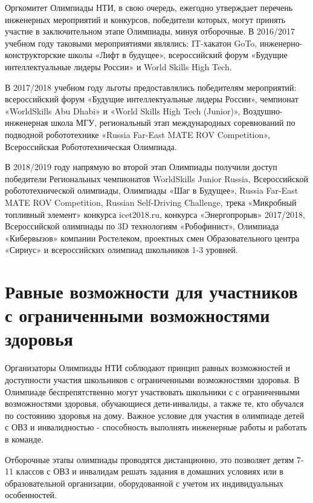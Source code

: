 Оргкомитет Олимпиады НТИ, в свою очередь, ежегодно утверждает перечень инженерных мероприятий и конкурсов, победители которых, могут принять участие в заключительном этапе Олимпиады, минуя отборочные. В 2016/2017 учебном году таковыми мероприятиями являлись: IT-хакатон GoTo, инженерно-конструкторские школы «Лифт в будущее»,  всероссийский форум «Будущие интеллектуальные лидеры России» и World Skills High Tech. 

В 2017/2018 учебном году льготы предоставлялись победителям мероприятий: всероссийский форум «Будущие интеллектуальные лидеры России», чемпионат \linebreak «WorldSkills Abu Dhabi» и «World Skills High Tech (Junior)», Воздушно-инженерная школа МГУ, региональный этап международных соревнований по подводной робототехнике «Russia Far-East MATE ROV Competition», Всероссийская Робототехническая Олимпиада.

В 2018/2019 году напрямую во второй этап Олимпиады получили доступ победители Региональных чемпионатов WorldSkills Junior Russia, Всероссийской робототехнической олимпиады, Олимпиады «Шаг в Будущее», Russia Far-East MATE ROV Competition, Russian Self-Driving Challenge, трека «Микробный топливный элемент» конкурса icet2018.ru, конкурса «Энергопрорыв» 2017/2018, Всероссийской олимпиады по 3D технологиям «Робофинист», Олимпиада «Кибервызов» компании Ростелеком, проектных смен Образовательного центра «Сириус» и всероссийских олимпиад школьников 1-3 уровней.

\section*{Равные возможности для участников с  ограниченными возможностями здоровья}

Организаторы Олимпиады НТИ соблюдают принцип равных возможностей и доступности участия школьников с ограниченными возможностями здоровья. В Олимпиаде беспрепятственно могут участвовать школьники с с ограниченными возможностями здоровья, обучающиеся дети-инвалиды, а также те, кто обучался по состоянию здоровья на дому. Важное условие для участия в олимпиаде детей с ОВЗ и инвалидностью - способность выполнять инженерные работы и работать в команде.


Отборочные этапы олимпиады проводятся дистанционно, это позволяет детям 7-11 классов с ОВЗ и инвалидам решать задания в домашних условиях или в образовательной организации, оборудованной с учетом их индивидуальных особенностей.


